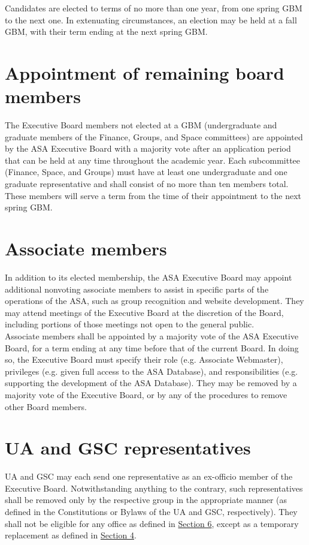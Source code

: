 \documentclass[12pt]{article}
\begin{document}
Candidates are elected to terms of no more than one year, from one spring GBM to the next one. In
extenuating circumstances, an election may be held at a fall GBM, with their term ending at the next
spring GBM.

\section{Appointment of remaining board members}
The Executive Board members not elected at a GBM (undergraduate and graduate members of the
Finance, Groups, and Space committees) are appointed by the ASA Executive Board with a majority
vote after an application period that can be held at any time throughout the academic year. Each
subcommittee (Finance, Space, and Groups) must have at least one undergraduate and one graduate
representative and shall consist of no more than ten members total. These members will serve a term
from the time of their appointment to the next spring GBM.

\section{Associate members}
In addition to its elected membership, the ASA Executive Board may appoint additional nonvoting
associate members to assist in specific parts of the operations of the ASA, such as group recognition
and website development. They may attend meetings of the Executive Board at the discretion of the
Board, including portions of those meetings not open to the general public.
\\

Associate members shall be appointed by a majority vote of the ASA Executive Board, for a term
ending at any time before that of the current Board. In doing so, the Executive Board must specify
their role (e.g. Associate Webmaster), privileges (e.g. given full access to the ASA Database), and
responsibilities (e.g. supporting the development of the ASA Database). They may be removed by a
majority vote of the Executive Board, or by any of the procedures to remove other Board members.

\section{UA and GSC representatives}
UA and GSC may each send one representative as an ex-officio member of the Executive Board.
Notwithstanding anything to the contrary, such representatives shall be removed only by the respective
group in the appropriate manner (as defined in the Constitutions or Bylaws of the UA and GSC,
respectively). They shall not be eligible for any office as defined in \hyperref[art:IV_sect6]{Section 6}, except as a temporary
replacement as defined in \hyperref[art:IV_sect4]{Section 4}.
\end{document}
